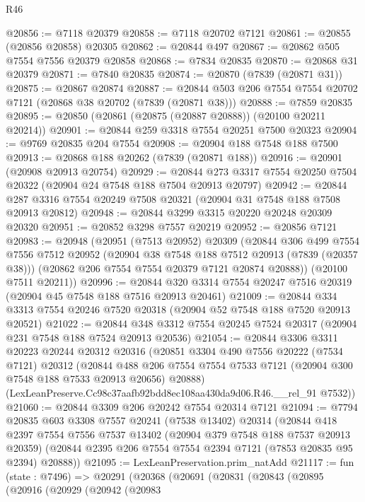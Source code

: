 \begin{lexlean}{R46}
\begin{coremodule}
@20856 := @7118 @20379
@20858 := @7118 @20702 @7121
@20861 := @20855 (@20856 @20858) @20305
@20862 := @20844 @497
@20867 := @20862 @505 @7554 @7556 @20379 @20858
@20868 := @7834 @20835
@20870 := @20868 @31 @20379
@20871 := @7840 @20835
@20874 := @20870 (@7839 (@20871 @31))
@20875 := @20867 @20874
@20887 := @20844 @503 @206 @7554 @7554 @20702 @7121 (@20868 @38 @20702 (@7839 (@20871 @38)))
@20888 := @7859 @20835
@20895 := @20850 (@20861 (@20875 (@20887 @20888)) (@20100 @20211 @20214))
@20901 := @20844 @259 @3318 @7554 @20251 @7500 @20323
@20904 := @9769 @20835 @204 @7554
@20908 := @20904 @188 @7548 @188 @7500
@20913 := @20868 @188 @20262 (@7839 (@20871 @188))
@20916 := @20901 (@20908 @20913 @20754)
@20929 := @20844 @273 @3317 @7554 @20250 @7504 @20322 (@20904 @24 @7548 @188 @7504 @20913 @20797)
@20942 := @20844 @287 @3316 @7554 @20249 @7508 @20321 (@20904 @31 @7548 @188 @7508 @20913 @20812)
@20948 := @20844 @3299 @3315 @20220 @20248 @20309 @20320
@20951 := @20852 @3298 @7557 @20219
@20952 := @20856 @7121
@20983 := @20948
    (@20951
      (@7513 @20952)
      @20309
      (@20844
        @306
        @499
        @7554
        @7556
        @7512
        @20952
        (@20904 @38 @7548 @188 @7512 @20913 (@7839 (@20357 @38)))
        (@20862 @206 @7554 @7554 @20379 @7121 @20874 @20888))
      (@20100 @7511 @20211))
@20996 := @20844 @320 @3314 @7554 @20247 @7516 @20319 (@20904 @45 @7548 @188 @7516 @20913 @20461)
@21009 := @20844 @334 @3313 @7554 @20246 @7520 @20318 (@20904 @52 @7548 @188 @7520 @20913 @20521)
@21022 := @20844 @348 @3312 @7554 @20245 @7524 @20317 (@20904 @231 @7548 @188 @7524 @20913 @20536)
@21054 := @20844
    @3306
    @3311
    @20223
    @20244
    @20312
    @20316
    (@20851
      @3304
      @490
      @7556
      @20222
      (@7534 @7121)
      @20312
      (@20844 @488 @206 @7554 @7554 @7533 @7121 (@20904 @300 @7548 @188 @7533 @20913 @20656) @20888)
      (LexLeanPreserve.Cc98c37aafb92bdd8ec108aa430da9d06.R46.__rel_91 @7532))
@21060 := @20844 @3309 @206 @20242 @7554 @20314 @7121
@21094 := @7794
    @20835
    @603
    @3308
    @7557
    @20241
    (@7538 @13402)
    @20314
    (@20844
      @418
      @2397
      @7554
      @7556
      @7537
      @13402
      (@20904 @379 @7548 @188 @7537 @20913 @20359)
      (@20844 @2395 @206 @7554 @7554 @2394 @7121 (@7853 @20835 @95 @2394) @20888))
@21095 := LexLeanPreservation.prim_natAdd
@21117 := fun (state : @7496) =>
  @20291
    (@20368
      (@20691
        (@20831
          (@20843
            (@20895
              (@20916
                (@20929
                  (@20942
                    (@20983

\end{coremodule}
\end{lexlean}
